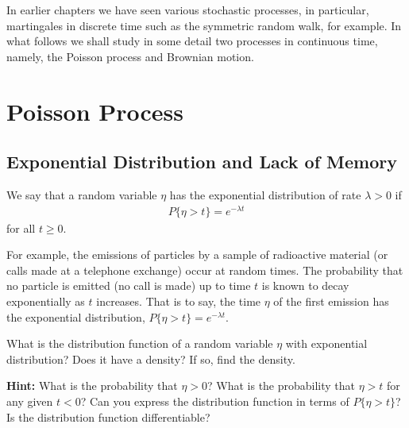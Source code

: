 In earlier chapters we have seen various stochastic processes, in particular, martingales in discrete time such as the symmetric random walk, for example. In what follows we shall study in some detail two processes in continuous time, namely, the Poisson process and Brownian motion.

\section{Poisson Process}
\label{sec:poisson-process}

\subsection{Exponential Distribution and Lack of Memory}
\label{sec:exponential-distribution}

\begin{Definition}
\label{def:exponential-distribution}
We say that a random variable $\eta$ has the exponential distribution of rate $\lambda > 0$ if
\begin{align}
P\{\eta > t\} = e^{-\lambda t}
\label{eq:exponential-tail}
\end{align}
for all $t \geq 0$.
\end{Definition}

For example, the emissions of particles by a sample of radioactive material (or calls made at a telephone exchange) occur at random times. The probability that no particle is emitted (no call is made) up to time $t$ is known to decay exponentially as $t$ increases. That is to say, the time $\eta$ of the first emission has the exponential distribution, $P\{\eta > t\} = e^{-\lambda t}$.

\begin{Exercise}
\label{ex:exponential-distribution-function}
What is the distribution function of a random variable $\eta$ with exponential distribution? Does it have a density? If so, find the density.

\noindent\textbf{Hint:} What is the probability that $\eta > 0$? What is the probability that $\eta > t$ for any given $t < 0$? Can you express the distribution function in terms of $P\{\eta > t\}$? Is the distribution function differentiable?
\end{Exercise}

